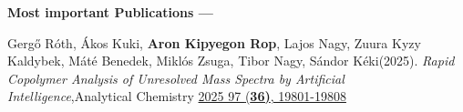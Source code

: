 {\bf Most important Publications ---}%
\begin{etaremune}
\item
	Gergő Róth, Ákos Kuki, {\bf Aron Kipyegon Rop}, Lajos Nagy, Zuura Kyzy Kaldybek, Máté Benedek, Miklós Zsuga, Tibor Nagy, Sándor Kéki(2025).
  {\it Rapid Copolymer Analysis of Unresolved Mass Spectra by Artificial Intelligence},Analytical Chemistry
  \href{http://dx.doi.org/10.1021/acs.analchem.5c03495}{ 2025 97 {(\bf36)}, 19801-19808}
\end{etaremune}
\else%
\fi

\renewcommand{\citeCount}[1]{}
